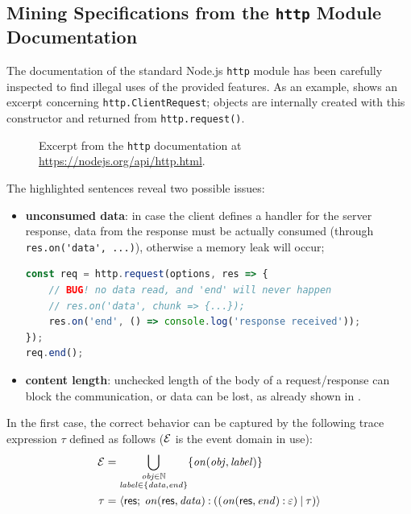 \subsection{Mining Specifications from the \lstinline{http} Module Documentation}\label{sec:spec-minining}

The documentation of the standard Node.js \lstinline{http} module has been carefully inspected to find illegal uses
of the provided features.
As an example,  shows an excerpt concerning \lstinline{http.ClientRequest};
objects are internally created with this constructor and returned from \lstinline{http.request()}.
\begin{figure}
	\caption{Excerpt from the \lstinline{http} documentation at \url{https://nodejs.org/api/http.html}.}
	\label{fig:httpDoc}
\end{figure}
The highlighted sentences reveal two possible issues:
\begin{itemize}
	\item \textbf{unconsumed data}: in case the client defines a handler for the server response, data from the response must be actually consumed (through \lstinline|res.on('data', ...)|), otherwise a memory leak will occur;
	\begin{lstlisting}[language=javascript]
const req = http.request(options, res => {
	// BUG! no data read, and 'end' will never happen
	// res.on('data', chunk => {...});
	res.on('end', () => console.log('response received'));
});
req.end();
	\end{lstlisting}
	\item \textbf{content length}: unchecked length of the body of a request/response can block the communication, or data can be lost, as already shown in .
\end{itemize}
In the first case, the correct behavior can be captured by the following trace expression $\tau$ defined as follows (\(\mathcal{E}\) is the event domain in use):
\begin{align*}
	\mathcal{E} &= \bigcup_{
			\substack{
				\mathit{obj} \in \mathbb{N}\\
				\mathit{label} \in \{ \mathit{data}, \mathit{end} \}
			}
		}
		\{ \mathit{on}(\mathit{obj}, \mathit{label}) \} \\
	\tau &= {\langle}\mathsf{res};\:{\mathit{on}(\mathsf{res}, \mathit{data}) \mathbin{:} ((\mathit{on}(\mathsf{res}, \mathit{end}) \mathbin{:} \varepsilon) \mathbin{|} \tau)}{\rangle}
\end{align*}


